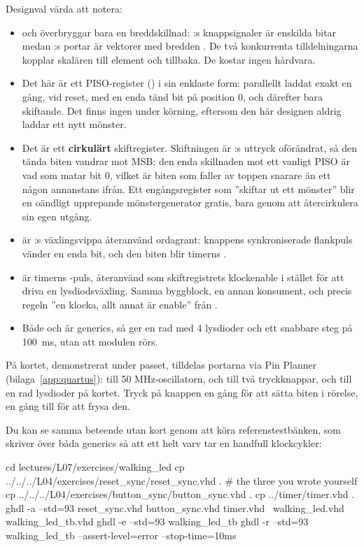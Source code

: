 Designval värda att notera:
\begin{itemize}
  \item {} och  överbryggar bara en breddskillnad:
    :s knappsignaler är enskilda bitar medan :s portar är
    vektorer med bredden . De två konkurrenta tilldelningarna kopplar skalären till
    element  och tillbaka. De kostar ingen hårdvara.
  \item Det här är ett PISO-register () i sin enklaste form: parallellt laddat
    exakt en gång, vid reset, med en enda tänd bit på position 0, och därefter bara skiftande. Det
    finns ingen  under körning, eftersom den här designen aldrig laddar ett nytt mönster.
  \item Det är ett \textbf{cirkulärt} skiftregister. Skiftningen är :s uttryck
    oförändrat, så den tända biten vandrar mot MSB; den enda skillnaden mot ett vanligt PISO är vad
    som matar bit 0, vilket är biten som faller av toppen snarare än ett  någon
    annanstans ifrån. Ett engångsregister som ”skiftar ut ett mönster” blir en oändligt upprepande
    mönstergenerator gratis, bara genom att återcirkulera sin egen utgång.
  \item {} är :s växlingsvippa återanvänd ordagrant:
    knappens synkroniserade flankpuls vänder en enda bit, och den biten blir timerns .
  \item {} är timerns -puls, återanvänd som skiftregistrets klockenable
    i stället för att driva en lysdiodsväxling. Samma byggblock, en annan konsument, och precis
    regeln ”en klocka, allt annat är enable” från .
  \item Både  och  är generics, så 
    ger en rad med 4 lysdioder och  ett snabbare steg på 100~ms,
    utan att modulen rörs.
\end{itemize}

På kortet, demonstrerat under passet, tilldelas portarna via Pin Planner (bilaga~\ref{app:quartus}):
 till 50 MHz-oscillatorn,  och  till två tryckknappar, och
 till en rad lysdioder på kortet. Tryck på knappen en gång för att sätta biten i rörelse,
en gång till för att frysa den.

Du kan se samma beteende utan kort genom att köra referenstestbänken, som skriver över båda generics
så att ett helt varv tar en handfull klockcykler:

\begin{shell}
cd lectures/L07/exercises/walking_led
cp ../../../L04/exercises/reset_sync/reset_sync.vhd .   # the three you wrote yourself
cp ../../../L04/exercises/button_sync/button_sync.vhd .
cp ../timer/timer.vhd .
ghdl -a --std=93 reset_sync.vhd button_sync.vhd timer.vhd \
                 walking_led.vhd walking_led_tb.vhd
ghdl -e --std=93 walking_led_tb
ghdl -r --std=93 walking_led_tb --assert-level=error --stop-time=10ms
\end{shell}
